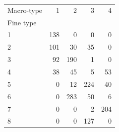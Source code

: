 \begin{tabular}{lrrrr}
\toprule
Macro-type & 1 & 2 & 3 & 4 \\
Fine type &  &  &  &  \\
\midrule
1 & 138 & 0 & 0 & 0 \\
2 & 101 & 30 & 35 & 0 \\
3 & 92 & 190 & 1 & 0 \\
4 & 38 & 45 & 5 & 53 \\
5 & 0 & 12 & 224 & 40 \\
6 & 0 & 283 & 50 & 6 \\
7 & 0 & 0 & 2 & 204 \\
8 & 0 & 0 & 127 & 0 \\
\bottomrule
\end{tabular}
